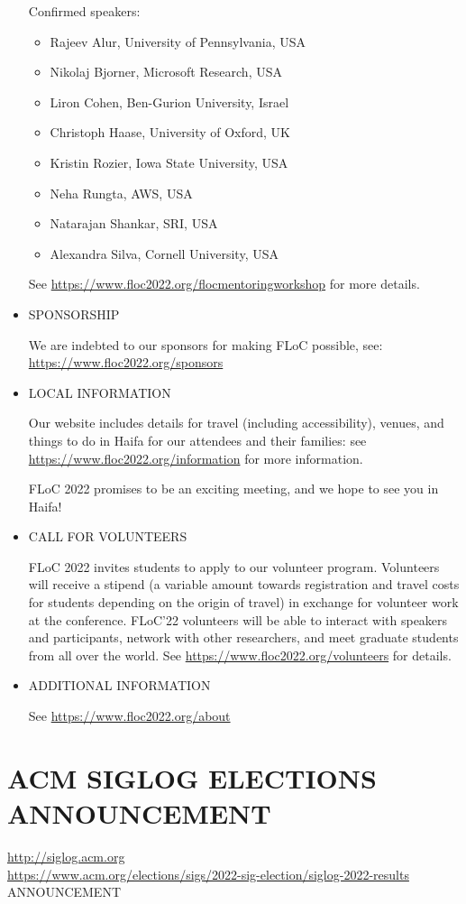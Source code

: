 \documentclass[prodmode,acmtecs]{acmsmall} %
\begin{document}
\begin{itemize}
  Confirmed speakers: 
 
\begin{itemize}\item  Rajeev Alur, University of Pennsylvania, USA
\item  Nikolaj Bjorner, Microsoft Research, USA
\item  Liron Cohen, Ben-Gurion University, Israel
\item  Christoph Haase, University of Oxford, UK
\item  Kristin Rozier, Iowa State University, USA
\item  Neha Rungta, AWS, USA
\item  Natarajan Shankar, SRI, USA
\item  Alexandra Silva, Cornell University, USA
\end{itemize} 
  See \href{https://www.floc2022.org/flocmentoringworkshop}{https://www.floc2022.org/flocmentoringworkshop} for more details. 
 
\item  SPONSORSHIP 
 
  We are indebted to our sponsors for making FLoC possible, see: \href{https://www.floc2022.org/sponsors}{https://www.floc2022.org/sponsors} 
 
\item  LOCAL INFORMATION 
 
  Our website includes details for travel (including accessibility), venues, and things to do in Haifa for our attendees and their families: see \href{https://www.floc2022.org/information}{https://www.floc2022.org/information} for more information. 
 
  FLoC 2022 promises to be an exciting meeting, and we hope to see you in Haifa! 
 
\item  CALL FOR VOLUNTEERS 
 
  FLoC 2022 invites students to apply to our volunteer program. Volunteers will receive a stipend (a variable amount towards registration and travel costs for students depending on the origin of travel) in exchange for volunteer work at the conference. FLoC’22 volunteers will be able to interact with speakers and participants, network with other researchers, and meet graduate students from all over the world. See \href{https://www.floc2022.org/volunteers}{https://www.floc2022.org/volunteers} for details. 
 
\item  ADDITIONAL INFORMATION 
 
  See \href{https://www.floc2022.org/about}{https://www.floc2022.org/about} 
 
\end{itemize}\section{ACM SIGLOG ELECTIONS ANNOUNCEMENT}\label{ACMSIGLOGELECTIONSANNOUNCEMENT}  \href{http://siglog.acm.org}{http://siglog.acm.org}\\ 
  \href{https://www.acm.org/elections/sigs/2022-sig-election/siglog-2022-results}{https://www.acm.org/elections/sigs/2022-sig-election/siglog-2022-results}\\ 
ANNOUNCEMENT 
\end{document}
